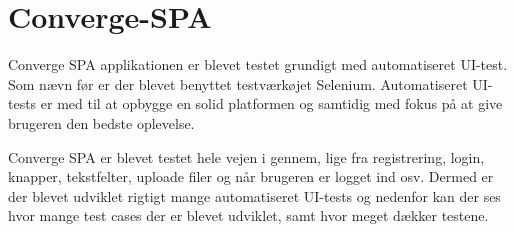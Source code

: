 \chapter{Converge-SPA}
Converge SPA applikationen er blevet testet grundigt med automatiseret UI-test. Som nævn før er der blevet benyttet testværkøjet Selenium. Automatiseret UI-tests er med til at opbygge en solid platformen og samtidig med fokus på at give brugeren den bedste oplevelse.

Converge SPA er blevet testet hele vejen i gennem, lige fra registrering, login, knapper, tekstfelter, uploade filer og når brugeren er logget ind osv. Dermed er der blevet udviklet rigtigt mange automatiseret UI-tests og nedenfor kan der ses hvor mange test cases der er blevet udviklet, samt hvor meget dækker testene. 
